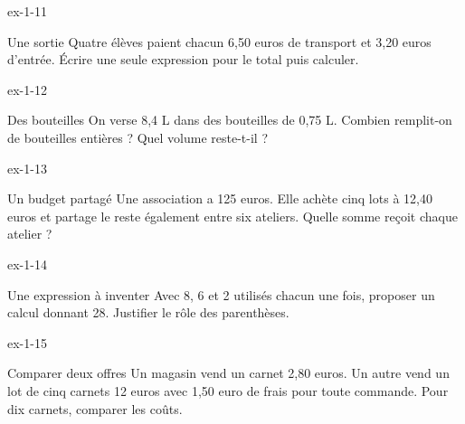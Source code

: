 \begin{blocLivre}{ex-1-11}\begin{exercice}[3]{Une sortie}
Quatre élèves paient chacun 6,50 euros de transport et 3,20 euros d’entrée. Écrire une seule expression pour le total puis calculer.
\end{exercice}\end{blocLivre}
\begin{blocLivre}{ex-1-12}\begin{exercice}[3]{Des bouteilles}
On verse 8,4 L dans des bouteilles de 0,75 L. Combien remplit-on de bouteilles entières ? Quel volume reste-t-il ?
\end{exercice}\end{blocLivre}
\begin{blocLivre}{ex-1-13}\begin{exercice}[3]{Un budget partagé}
Une association a 125 euros. Elle achète cinq lots à 12,40 euros et partage le reste également entre six ateliers. Quelle somme reçoit chaque atelier ?
\end{exercice}\end{blocLivre}
\begin{blocLivre}{ex-1-14}\begin{exercice}[3]{Une expression à inventer}
Avec 8, 6 et 2 utilisés chacun une fois, proposer un calcul donnant 28. Justifier le rôle des parenthèses.
\end{exercice}\end{blocLivre}
\begin{blocLivre}{ex-1-15}\begin{exercice}[3]{Comparer deux offres}
Un magasin vend un carnet 2,80 euros. Un autre vend un lot de cinq carnets 12 euros avec 1,50 euro de frais pour toute commande. Pour dix carnets, comparer les coûts.
\end{exercice}\end{blocLivre}

\clearpage

